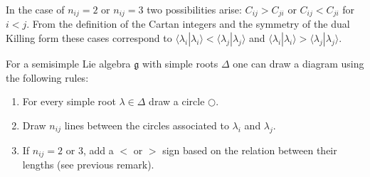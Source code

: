     \begin{remark}
        In the case of $n_{ij} = 2$ or $n_{ij} = 3$ two possibilities arise: $C_{ij}>C_{ji}$ or $C_{ij}<C_{ji}$ for $i<j$. From the definition of the Cartan integers and the symmetry of the dual Killing form these cases correspond to $\langle\lambda_i|\lambda_i\rangle<\langle\lambda_j|\lambda_j\rangle$ and $\langle\lambda_i|\lambda_i\rangle>\langle\lambda_j|\lambda_j\rangle$.
    \end{remark}

    \begin{construct}\label{lie:construct_dynkin}
        For a semisimple Lie algebra $\mathfrak{g}$ with simple roots $\Delta$ one can draw a diagram using the following rules:
        \begin{enumerate}
            \item For every simple root $\lambda\in\Delta$ draw a circle $\bigcirc$.
            \item Draw $n_{ij}$ lines between the circles associated to $\lambda_i$ and $\lambda_j$.
            \item If $n_{ij}=2$ or 3, add a $<$ or $>$ sign based on the relation between their lengths (see previous remark).
        \end{enumerate}
    \end{construct}

